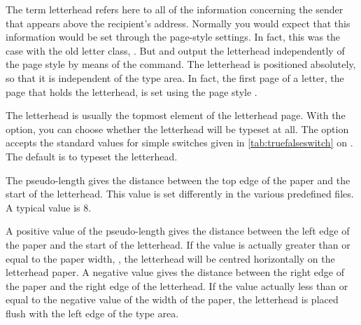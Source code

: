 The term letterhead refers here to all of the information concerning the
sender that appears above the recipient's address. Normally you would expect
that this information would be set through the page-style settings. In fact,
this was the case with the old letter class, .
But  and  output the
letterhead independently of the page style by means of the
 command.
\iftrue%
  The letterhead is positioned absolutely, so that it is independent of the
  type area. In fact, the first page of a letter, the page that holds the
  letterhead, is set using the page style
  .%
\fi


\begin{Declaration}
\end{Declaration}
%
%
The letterhead is usually the topmost
element of the letterhead page. With the  option, you can
choose whether the letterhead will be typeset at all. The option accepts the
standard values for simple switches given in \autoref{tab:truefalseswitch} on
. The default is to typeset the letterhead.%
%
\EndIndexGroup


\begin{Declaration}
\end{Declaration}
The  pseudo-length gives the distance between the top
edge of the paper and the start of the letterhead. This value is set
differently in the various predefined
 files. A
typical value is 8.%
\EndIndexGroup


\begin{Declaration}
\end{Declaration}
A positive value of the
 pseudo-length gives
the distance between the left edge of the paper and the start of the
letterhead. If the value is actually greater than or
equal to the paper width,
,
the letterhead will be centred horizontally on the letterhead paper. A
negative value gives the distance between the right edge of the paper and the
right edge of the letterhead. If the value actually less than or equal to the
negative value of the width of the paper, the letterhead is placed flush with
the left edge of the type area.

